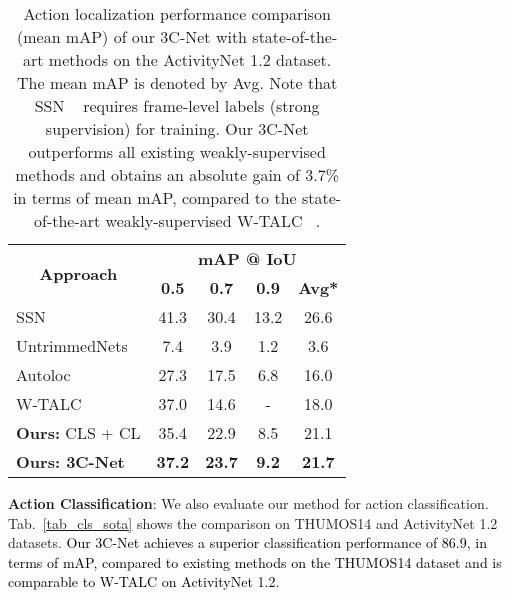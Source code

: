 \documentclass[10pt,twocolumn,letterpaper]{article}
\begin{document}
\begin{table}[t]
\centering
\small
\begin{tabular}{|l|c|c|c|c|}
\hline
\multicolumn{1}{|c|}{\multirow{2}{*}{\textbf{Approach}}} & \multicolumn{4}{c|}{\textbf{mAP @ IoU}} \\ \cline{2-5} 
\multicolumn{1}{|c|}{} & \textbf{0.5} & \textbf{0.7} & \textbf{0.9} & \textbf{Avg*} \\ \hline
SSN~\cite{ssn} & 41.3 & 30.4 & 13.2 & 26.6 \\ \hline \hline
UntrimmedNets~\cite{untrimnets} & 7.4 & 3.9 & 1.2 & 3.6 \\ \hline
Autoloc~\cite{autoloc} & 27.3 & 17.5 & 6.8 & 16.0 \\ \hline
W-TALC~\cite{wtalc} & 37.0 & 14.6 & - & 18.0 \\ 
\hline \hline
\textbf{Ours:} CLS + CL & 35.4 & 22.9 & 8.5 & 21.1 \\ \hline
\textbf{Ours: 3C-Net} & \textbf{37.2} & \textbf{23.7} & \textbf{9.2} & \textbf{21.7} \\ \hline
\end{tabular}
\vspace{0.05cm}
\caption{\label{tab_actnet_loc_sota}Action localization performance comparison (mean mAP) of our 3C-Net with state-of-the-art methods on the ActivityNet 1.2 dataset. The mean mAP is denoted by Avg. Note that SSN ~\cite{ssn} requires frame-level labels (strong supervision) for training. Our 3C-Net outperforms all existing weakly-supervised methods and obtains an absolute gain of 3.7\% in terms of mean mAP, compared to the state-of-the-art weakly-supervised W-TALC ~\cite{wtalc}.}\vspace{-0.3cm}
\end{table}



\noindent\textbf{Action Classification}:
We also evaluate our method for action classification. Tab.~\ref{tab_cls_sota} shows the comparison on  THUMOS14 and ActivityNet 1.2 datasets. 
\textcolor{black}{Our 3C-Net achieves a superior classification performance of 86.9, in terms of mAP, compared to existing methods on the THUMOS14 dataset and is comparable to W-TALC on ActivityNet 1.2.}
\end{document}
